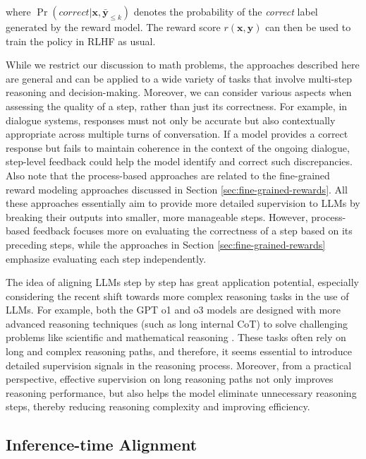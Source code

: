 \noindent where $\Pr(\textit{correct}|\mathbf{x},\bar{\mathbf{y}}_{\le k})$ denotes the probability of the \textit{correct} label generated by the reward model. The reward score $r(\mathbf{x},\mathbf{y})$ can then be used to train the policy in RLHF as usual.

While we restrict our discussion to math problems, the approaches described here are general and can be applied to a wide variety of tasks that involve multi-step reasoning and decision-making. Moreover, we can consider various aspects when assessing the quality of a step, rather than just its correctness. For example, in dialogue systems, responses must not only be accurate but also contextually appropriate across multiple turns of conversation. If a model provides a correct response but fails to maintain coherence in the context of the ongoing dialogue, step-level feedback could help the model identify and correct such discrepancies. Also note that the process-based approaches are related to the fine-grained reward modeling approaches discussed in Section \ref{sec:fine-grained-rewards}. All these approaches essentially aim to provide more detailed supervision to LLMs by breaking their outputs into smaller, more manageable steps. However, process-based feedback focuses more on evaluating the correctness of a step based on its preceding steps, while the approaches in Section \ref{sec:fine-grained-rewards} emphasize evaluating each step independently.

The idea of aligning LLMs step by step has great application potential, especially considering the recent shift towards more complex reasoning tasks in the use of LLMs. For example, both the GPT o1 and o3 models are designed with more advanced reasoning techniques (such as long internal CoT) to solve challenging problems like scientific and mathematical reasoning \cite{openai:2024learning}. These tasks often rely on long and complex reasoning paths, and therefore, it seems essential to introduce detailed supervision signals in the reasoning process. Moreover, from a practical perspective, effective supervision on long reasoning paths not only improves reasoning performance, but also helps the model eliminate unnecessary reasoning steps, thereby reducing reasoning complexity and improving efficiency.

\subsection{Inference-time Alignment}

